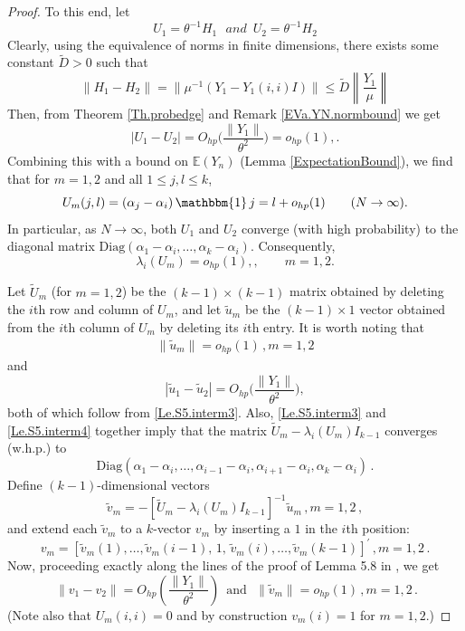 \documentclass[11pt, reqno]{amsart}
\DeclareMathOperator{\one}{\mathbbm{1}} %
\numberwithin{equation}{section}
\newcommand{\E}{\mbox{${\mathbb E}$}}
\begin{document}
\begin{proof}
To this end, let
\[
U_1 = \theta^{-1}H_1\,\,\,\,and\,\,\,U_2 = \theta^{-1}H_2
\]
Clearly, using the equivalence of norms in finite dimensions, there exists some constant $\tilde{D} > 0$ such that
\[
\| H_1 -H_2\| = \|\mu^{-1}(Y_1 - Y_1(i,i)I)\| \le \tilde D \left\|\frac{Y_1}{\mu}\right\|
\]
Then, from Theorem \ref{Th.probedge} and Remark \ref{EVa.YN.normbound} we get
\begin{equation}\label{Le.S5.interm2}
|U_1 - U_2| = O_{hp}\Big(\frac{\|Y_1\|}{\theta^2}\Big) = o_{hp}(1),.
\end{equation}
Combining this with a bound on $\E(Y_n)$ (Lemma \ref{ExpectationBound}), we find that for $m=1,2$ and all $1 \le j,l \le k$,
\begin{equation}\label{Le.S5.interm3}
U_m(j,l) = (\alpha_j - \alpha_i)\one{j=l} + o_{hp}(1) \qquad (N \to \infty).
\end{equation}
In particular, as $N\to\infty$, both $U_1$ and $U_2$ converge (with high probability) to the diagonal matrix $\mathrm{Diag}(\alpha_1-\alpha_i,\ldots,\alpha_k-\alpha_i)$. Consequently,
\begin{equation}\label{Le.S5.interm4}
\lambda_i(U_m) = o_{hp}(1),, \qquad m=1,2.
\end{equation}

Let $\tilde{U}_m$ (for $m=1,2$) be the $(k-1)\times(k-1)$ matrix obtained by deleting the $i$th row and column of $U_m$, and let $\tilde{u}_m$ be the $(k-1)\times1$ vector obtained from the $i$th column of $U_m$ by deleting its $i$th entry. It is worth noting that
\begin{align*}
\|\tilde u_m\|=o_{hp}(1)\,,m=1,2
\end{align*}
and
\begin{equation}\label{Le.S5.interm5}
|\tilde{u}_1-\tilde{u}_2| = O_{hp}\Big(\frac{\|Y_1\|}{\theta^2}\Big),
\end{equation}
both of which follow from \eqref{Le.S5.interm3}. Also, \eqref{Le.S5.interm3} and \eqref{Le.S5.interm4} together imply that the matrix $\tilde{U}_m - \lambda_i(U_m)I_{k-1}$ converges (w.h.p.) to
\[
\mathrm{Diag}(\alpha_1-\alpha_i,\ldots,\alpha_{i-1}-\alpha_i,\alpha_{i+1}-\alpha_i,\alpha_k-\alpha_i)\,.
\]
Define $(k-1)$-dimensional vectors
\[
\tilde v_m=-\left[\tilde U_m-\lambda_i(U_m)I_{k-1}\right]^{-1}\tilde u_m\,,m=1,2\,,
\]
and extend each $\tilde{v}_m$ to a $k$-vector $v_m$ by inserting a $1$ in the $i$th position:
\[
v_m=\left[\tilde v_m(1),\ldots,\tilde v_m(i-1),\,1,\,\tilde v_m(i),\ldots,\tilde v_m(k-1)\right]^\prime\,,m=1,2\,.
\]
Now, proceeding exactly along the lines of the proof of Lemma 5.8 in \cite{chakrabarty2020eigenvalues}, we get
\[\
\|v_1-v_2\|=O_{hp}\left(\frac{\|Y_1\|}{\theta^2}\right)\, \text{ and } \,\, \|\tilde v_m\|=o_{hp}(1)\,,m=1,2\,.
\]
(Note also that $U_m(i,i)=0$ and by construction $v_m(i)=1$ for $m=1,2$.)


\end{proof}
\end{document}
